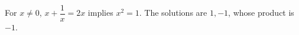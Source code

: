 For $x\ne0$, $x+\dfrac{1}{x}=2x$ implies $x^2=1$. The solutions are $1,-1$, whose product is $\boxed{-1}$.
